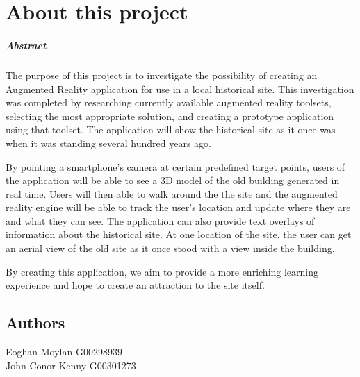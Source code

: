 \graphicspath{ {/Home/Users/TheShockMaster/Desktop} }

\chapter*{About this project}

\paragraph{Abstract}
The purpose of this project is to investigate the possibility of creating an Augmented Reality application for use in a local historical site. This investigation was completed by researching currently available augmented reality toolsets, selecting the most appropriate solution, and creating a prototype application using that toolset. The application will show the historical site as it once was when it was standing several hundred years ago.

By pointing a smartphone’s camera at certain predefined target points, users of the application will be able to see a 3D model of the old building generated in real time. Users will then able to walk around the the site and the augmented reality engine will be able to track the user’s location and update where they are and what they can see. The application can also provide text overlays of information about the historical site. At one location of the site, the user can get an aerial view of the old site as it once stood with a view inside the building.

By creating this application, we aim to provide a more enriching learning experience and hope to create an attraction to the site itself.
\section{Authors}
Eoghan Moylan G00298939 \\
John Conor Kenny G00301273
